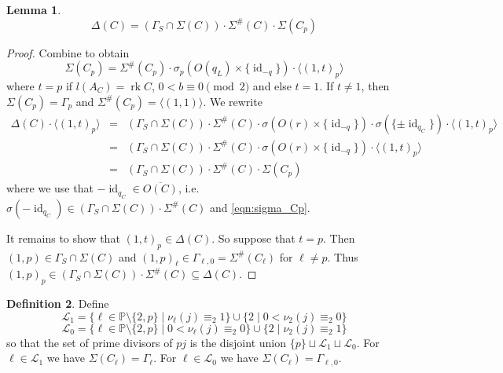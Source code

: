 \documentclass{amsart}
\theoremstyle{definition}
\newtheorem{definition}{Definition}[section]
\theoremstyle{plain}
\newtheorem{lemma}[definition]{Lemma}
\DeclareMathOperator{\rk}{rk}
\DeclareMathOperator{\id}{id}
\newcommand{\PP}{\mathbb{P}}
\begin{document}
\begin{lemma}
 \[\Delta(C)=\left(\Gamma_S \cap \Sigma(C)\right)\cdot \Sigma^\#(C)
 \cdot \Sigma(C_p) \]
\end{lemma}
\begin{proof}
Combine  to obtain
\begin{equation}\label{eqn:sigma_Cp}
\Sigma(C_p)=
\Sigma^\#(C_p)\cdot \sigma_p\left(O(q_L)\times \{ \id_{-q}\}\right) \cdot \langle (1,t)_p \rangle
\end{equation}
where $t=p$ if $l(A_C)=\rk C$, $0<b\equiv 0 \pmod 2$ and else $t=1$.
If $t\neq 1$, then $\Sigma(C_p)=\Gamma_p$ and
$\Sigma^\#(C_p)= \langle (1,1)\rangle$.
We rewrite
\begin{eqnarray*}
\Delta(C) \cdot \langle (1,t)_p\rangle &=& \left(\Gamma_S \cap \Sigma(C)\right)\cdot
\Sigma^\#(C) \cdot \sigma\left(O(r)\times \{ \id_{-q}\}\right) \cdot \sigma(\{\pm \id_{q_C}\})\cdot \langle (1,t)_p\rangle\\
&=& \left(\Gamma_S \cap \Sigma(C)\right)\cdot
\Sigma^\#(C) \cdot \sigma\left(O(r)\times \{ \id_{-q}\}\right) \cdot\langle (1,t)_p\rangle\\
 &=& \left(\Gamma_S \cap \Sigma(C)\right)\cdot
\Sigma^\#(C) \cdot \Sigma(C_p)
\end{eqnarray*}
where we use that $-\id_{q_C} \in \overline{O(C)}$, i.e.\ $\sigma(-\id_{q_C}) \in (\Gamma_S \cap \Sigma(C))\cdot \Sigma^\#(C)$ and \cref{eqn:sigma_Cp}.

It remains to show that $(1,t)_p \in \Delta(C)$.
So suppose that $t=p$. Then $(1,p) \in \Gamma_S \cap \Sigma(C)$ and $(1,p)_\ell \in \Gamma_{\ell,0}= \Sigma^\#(C_\ell)$ for $\ell\neq p$. Thus $(1,p)_p \in (\Gamma_S\cap\Sigma(C))\cdot \Sigma^\#(C)\subseteq \Delta(C)$.
\end{proof}

\begin{definition}
Define
\[\mathcal{L}_1 = \{\ell \in \PP\setminus \{2,p\} \mid \nu_\ell(j) \equiv_2 1\} \cup \{2 \mid 0 <\nu_2(j) \equiv_2 0 \}\]
\[\mathcal{L}_0 = \{\ell \in \PP\setminus \{2,p\} \mid 0< \nu_\ell(j)  \equiv_2 0\} \cup \{2 \mid \nu_2(j) \equiv_2 1\}\]
so that the set of prime divisors of $pj$ is the disjoint union $\{p\} \sqcup \mathcal{L}_1 \sqcup \mathcal{L}_0$.
For $\ell \in \mathcal{L}_1$ we have  $\Sigma(C_\ell)=\Gamma_{\ell}$.
For $\ell \in \mathcal{L}_0$ we have $\Sigma(C_\ell)=\Gamma_{\ell,0}.$
 \end{definition}
\end{document}

